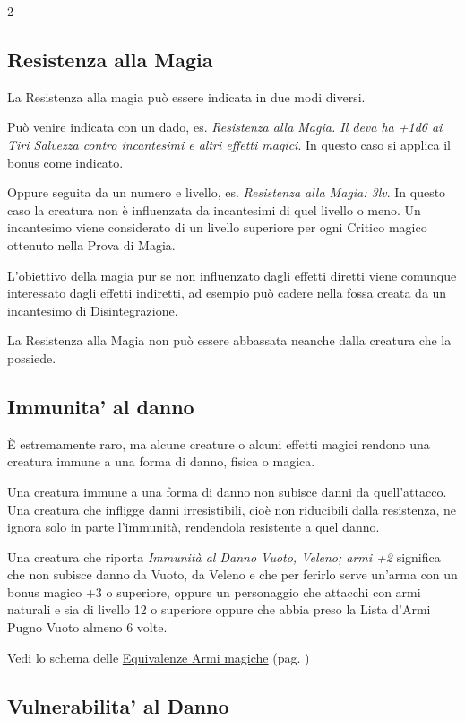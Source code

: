 \begin{multicols}{2}
\subsection{Resistenza alla Magia}\label{resistenzaallamagia}

La Resistenza alla magia può essere indicata in due modi diversi.

Può venire indicata con un dado, es. \emph{Resistenza alla Magia. Il deva ha +1d6 ai Tiri Salvezza contro incantesimi e altri effetti magici}. In questo caso si applica il bonus come indicato.

Oppure seguita da un numero e livello, es. \emph{Resistenza alla Magia: 3lv}. In questo caso la creatura non è influenzata da incantesimi di quel livello o meno. Un incantesimo viene considerato di un livello superiore per ogni Critico magico ottenuto nella Prova di Magia.

L'obiettivo della magia pur se non influenzato dagli effetti diretti viene comunque interessato dagli effetti indiretti, ad esempio può cadere nella fossa creata da un incantesimo di Disintegrazione.

La Resistenza alla Magia non può essere abbassata neanche dalla creatura che la possiede.

\subsection{Immunita' al danno}\label{immunitaaldanno}

È estremamente raro, ma alcune creature o alcuni effetti magici rendono una creatura immune a una forma di danno, fisica o magica.

Una creatura immune a una forma di danno non subisce danni da quell'attacco. Una creatura che infligge danni irresistibili, cioè non riducibili dalla resistenza, ne ignora solo in parte l'immunità, rendendola resistente a quel danno.

Una creatura che riporta \emph{Immunità al Danno Vuoto, Veleno; armi +2} significa che non subisce danno da Vuoto, da Veleno e che per ferirlo serve un'arma con un bonus magico +3 o superiore, oppure un personaggio che attacchi con armi naturali e sia di livello 12 o superiore oppure che abbia preso la Lista d'Armi Pugno Vuoto almeno 6 volte.

Vedi lo schema delle \hyperlink{equivalenzaarmimagiche}{Equivalenze Armi magiche} (pag. \pageref{equivalenzaarmimagiche})

\subsection{Vulnerabilita' al Danno}\label{vulnerabilitadanno}


\end{multicols}
